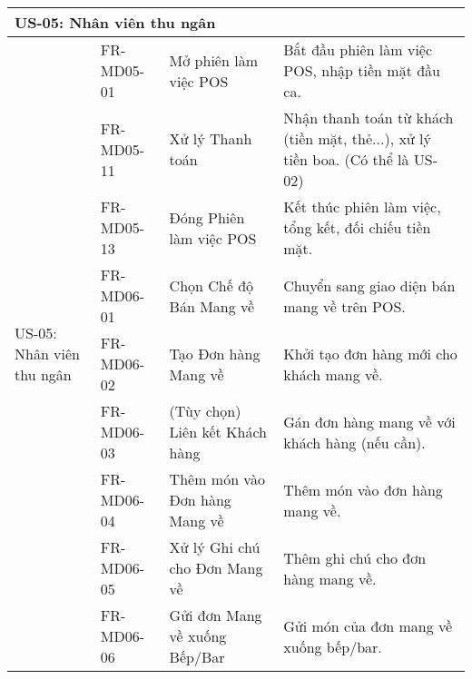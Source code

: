 \begin{longtable}{|m{2.5cm}|m{2.5cm}|m{5cm}|m{5cm}|}
	\multicolumn{4}{|l|}{\textbf{US-05: Nhân viên thu ngân}}                                                                                                                                                                               \\ \hline
	\multirow{11}{=}[2pt]{US-05: Nhân viên thu ngân}        & FR-MD05-01            & Mở phiên làm việc POS                                  & Bắt đầu phiên làm việc POS, nhập tiền mặt đầu ca.                                           \\
	                                                        & FR-MD05-11            & Xử lý Thanh toán                                       & Nhận thanh toán từ khách (tiền mặt, thẻ...), xử lý tiền boa. (Có thể là US-02)              \\
	                                                        & FR-MD05-13            & Đóng Phiên làm việc POS                                & Kết thúc phiên làm việc, tổng kết, đối chiếu tiền mặt.                                      \\ \cline{2-4}
	                                                        & FR-MD06-01            & Chọn Chế độ Bán Mang về                                & Chuyển sang giao diện bán mang về trên POS.                                                 \\
	                                                        & FR-MD06-02            & Tạo Đơn hàng Mang về                                   & Khởi tạo đơn hàng mới cho khách mang về.                                                    \\
	                                                        & FR-MD06-03            & (Tùy chọn) Liên kết Khách hàng                         & Gán đơn hàng mang về với khách hàng (nếu cần).                                              \\
	                                                        & FR-MD06-04            & Thêm món vào Đơn hàng Mang về                          & Thêm món vào đơn hàng mang về.                                                              \\
	                                                        & FR-MD06-05            & Xử lý Ghi chú cho Đơn Mang về                          & Thêm ghi chú cho đơn hàng mang về.                                                          \\
	                                                        & FR-MD06-06            & Gửi đơn Mang về xuống Bếp/Bar                          & Gửi món của đơn mang về xuống bếp/bar.                                                      \\

\end{longtable}
